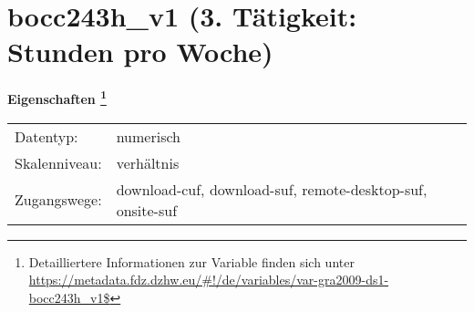 
    \setcounter{footnote}{0}

    \vspace*{-1.8cm}
	\section{bocc243h\_v1 (3. Tätigkeit: Stunden pro Woche)}
	\label{section:bocc243h_v1}



    \vspace*{0.5cm}
    \noindent\textbf{Eigenschaften
	\footnote{Detailliertere Informationen zur Variable finden sich unter
		\url{https://metadata.fdz.dzhw.eu/\#!/de/variables/var-gra2009-ds1-bocc243h_v1$}}}\\
	\begin{tabularx}{\hsize}{@{}lX}
	Datentyp: & numerisch \\
	Skalenniveau: & verhältnis \\
	Zugangswege: &
	  download-cuf, 
	  download-suf, 
	  remote-desktop-suf, 
	  onsite-suf
 \\
    \end{tabularx}



